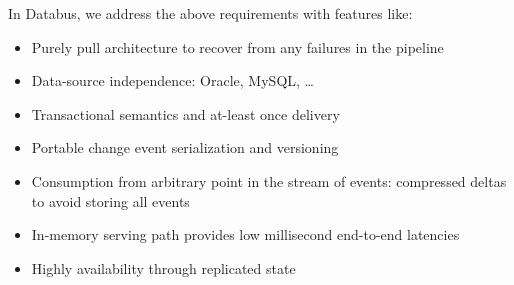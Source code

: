 In Databus, we address the above requirements with features like: 
\begin{itemize}
\item Purely pull architecture to recover from any failures in the pipeline
\item Data-source independence: Oracle, MySQL, \ldots
\item Transactional semantics and at-least once delivery
\item Portable change event serialization and versioning
\item Consumption from arbitrary point in the stream of events: compressed deltas to avoid storing all events
\item In-memory serving path provides low millisecond end-to-end latencies
\item Highly availability through replicated state
\end{itemize}
